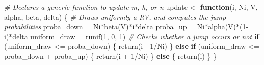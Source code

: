 \documentclass[
]{article}
\newenvironment{Shaded}{\begin{snugshade}}{\end{snugshade}}
\newcommand{\CommentTok}[1]{\textcolor[rgb]{0.56,0.35,0.01}{\textit{#1}}}
\newcommand{\ControlFlowTok}[1]{\textcolor[rgb]{0.13,0.29,0.53}{\textbf{#1}}}
\newcommand{\DecValTok}[1]{\textcolor[rgb]{0.00,0.00,0.81}{#1}}
\newcommand{\FunctionTok}[1]{\textcolor[rgb]{0.00,0.00,0.00}{#1}}
\newcommand{\NormalTok}[1]{#1}
\newcommand{\OtherTok}[1]{\textcolor[rgb]{0.56,0.35,0.01}{#1}}
\newcommand{\SpecialCharTok}[1]{\textcolor[rgb]{0.00,0.00,0.00}{#1}}
\begin{document}
\begin{Shaded}
\begin{Highlighting}[]
\CommentTok{\# Declares a generic function to update m, h, or n}
\NormalTok{update }\OtherTok{\textless{}{-}} \ControlFlowTok{function}\NormalTok{(i, Ni, V, alpha, beta, delta) \{}
  \CommentTok{\# Draws uniformly a RV, and computes the jump probabilities }
\NormalTok{  proba\_down   }\OtherTok{=}\NormalTok{ Ni}\SpecialCharTok{*}\FunctionTok{beta}\NormalTok{(V)}\SpecialCharTok{*}\NormalTok{i}\SpecialCharTok{*}\NormalTok{delta}
\NormalTok{  proba\_up     }\OtherTok{=}\NormalTok{ Ni}\SpecialCharTok{*}\FunctionTok{alpha}\NormalTok{(V)}\SpecialCharTok{*}\NormalTok{(}\DecValTok{1}\SpecialCharTok{{-}}\NormalTok{i)}\SpecialCharTok{*}\NormalTok{delta}
\NormalTok{  uniform\_draw }\OtherTok{=} \FunctionTok{runif}\NormalTok{(}\DecValTok{1}\NormalTok{, }\DecValTok{0}\NormalTok{, }\DecValTok{1}\NormalTok{)}
  \CommentTok{\# Checks whether a jump occurs or not}
  \ControlFlowTok{if}\NormalTok{ (uniform\_draw }\SpecialCharTok{\textless{}=}\NormalTok{ proba\_down) \{}
    \FunctionTok{return}\NormalTok{(i }\SpecialCharTok{{-}} \DecValTok{1}\SpecialCharTok{/}\NormalTok{Ni)}
\NormalTok{  \} }\ControlFlowTok{else} \ControlFlowTok{if}\NormalTok{ (uniform\_draw }\SpecialCharTok{\textless{}=}\NormalTok{ proba\_down }\SpecialCharTok{+}\NormalTok{ proba\_up) \{}
    \FunctionTok{return}\NormalTok{(i }\SpecialCharTok{+} \DecValTok{1}\SpecialCharTok{/}\NormalTok{Ni)}
\NormalTok{  \} }\ControlFlowTok{else}\NormalTok{ \{}
    \FunctionTok{return}\NormalTok{(i)}
\NormalTok{  \}}
\NormalTok{\}}


\end{Highlighting}
\end{Shaded}
\end{document}
